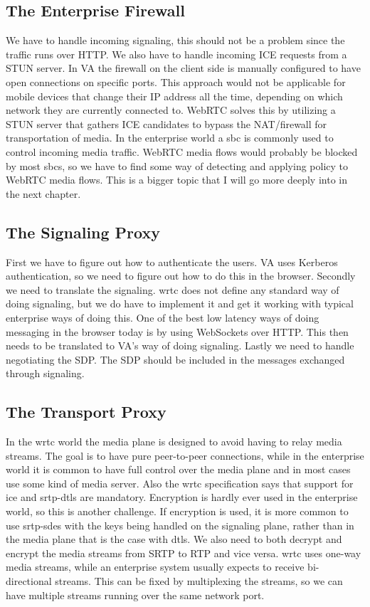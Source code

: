 \subsection{The Enterprise Firewall}
We have to handle incoming signaling, this should not be a problem since the traffic runs over HTTP. We also have to handle incoming ICE requests from a STUN server. In VA the firewall on the client side is manually configured to have open connections on specific ports. This approach would not be applicable for mobile devices that change their IP address all the time, depending on which network they are currently connected to. WebRTC solves this by utilizing a STUN server that gathers ICE candidates to bypass the NAT/firewall for transportation of media. In the enterprise world a \gls{sbc} is commonly used to control incoming media traffic. WebRTC media flows would probably be blocked by most \gls{sbc}s, so we have to find some way of detecting and applying policy to WebRTC media flows. This is a bigger topic that I will go more deeply into in the next chapter.

\subsection{The Signaling Proxy}
First we have to figure out how to authenticate the users. VA uses Kerberos authentication, so we need to figure out how to do this in the browser. Secondly we need to translate the signaling. \gls{wrtc} does not define any standard way of doing signaling, but we do have to implement it and get it working with typical enterprise ways of doing this. One of the best low latency ways of doing messaging in the browser today is by using WebSockets over HTTP. This then needs to be translated to VA's way of doing signaling. Lastly we need to handle negotiating the SDP. The SDP should be included in the messages exchanged through signaling.
 

\subsection{The Transport Proxy}
In the \gls{wrtc} world the media plane is designed to avoid having to relay media streams. The goal is to have pure peer-to-peer connections, while in the enterprise world it is common to have full control over the media plane and in most cases use some kind of media server. Also the \gls{wrtc} specification says that support for \gls{ice} and \gls{srtp}-\gls{dtls} are mandatory. Encryption is hardly ever used in the enterprise world, so this is another challenge. If encryption is used, it is more common to use \gls{srtp}-\gls{sdes} with the keys being handled on the signaling plane, rather than in the media plane that is the case with \gls{dtls}. We also need to both decrypt and encrypt the media streams from SRTP to RTP and vice versa. \gls{wrtc} uses one-way media streams, while an enterprise system usually expects to receive bi-directional streams. This can be fixed by multiplexing the streams, so we can have multiple streams running over the same network port.

